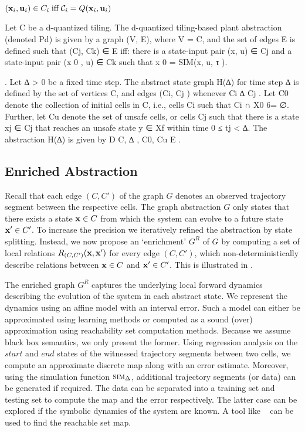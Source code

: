 $(\mathbf{x}_i, \mathbf{u}_i) \in C_i \; \text{iff} \; \mathcal{C}_i = Q(\mathbf{x}_i, \mathbf{u}_i)$

\begin{definition}[] Let C be a d-quantized tiling. The d-quantized
    tiling-based plant abstraction (denoted Pd) is given by a graph
    (V, E), where V = C, and the set of edges E is defined such that
    (Cj, Ck) ∈ E iff: there is a state-input pair (x, u) ∈ Cj and a
state-input pair (x 0 , u) ∈ Ck such that x 0 = SIM(x, u, τ ).
\end{definition}

\begin{definition}. Let ∆ > 0 be a fixed time
    step. The abstract state graph H(∆) for time step ∆ is defined by
    the set of vertices C, and edges (Ci, Cj ) whenever Ci ∆ Cj . Let
    C0 denote the collection of initial cells in C, i.e., cells Ci
    such that Ci ∩ X0 6= ∅. Further, let Cu denote the set of unsafe
    cells, or cells Cj such that there is a state xj ∈ Cj that reaches
    an unsafe state y ∈ Xf within time 0 ≤ tj < ∆. The abstraction
H(∆) is given by D C, ∆ , C0, Cu E .  \end{definition}

\subsection{Enriched Abstraction}



Recall that each edge $(C,C')$ of the graph $G$ denotes an observed
trajectory segment between the respective cells. The graph abstraction
$G$ only states that there exists a state $\mathbf{x} \in C$ from which the
system can evolve to a future state $\mathbf{x}' \in C'$. To increase the
precision we iteratively refined the abstraction by state
splitting. Instead, we now propose an `enrichment' $G^R$ of $G$ by computing a
set of local relations $R_{(C,C')}(\mathbf{x},\mathbf{x}')$ for every edge $(C,C')$,
which non-deterministically describe relations between $\mathbf{x} \in C$ and $\mathbf{x}'
\in C'$. This is illustrated in .

The enriched graph $G^R$ captures the underlying local forward
dynamics describing the evolution of the system in each abstract
state. We represent the dynamics using an affine model with an
interval error. Such a model can either be approximated using learning
methods or computed as a sound (over) approximation using reachability
set computation methods. Because we assume black box semantics, we
only present the former. Using regression analysis on the $start$ and
$end$ states of the witnessed trajectory segments between two cells,
we compute an approximate discrete map along with an error estimate.
Moreover, using the simulation function $\mbox{\sc sim}_\Delta$, additional
trajectory segments (or data) can be generated if required. The data
can be separated into a training set and testing set to compute the
map and the error respectively.  The latter case can be explored if
the symbolic dynamics of the system are known. A tool like
\flowstar~\cite{chen2013flow} can be used to find the reachable set
map.

